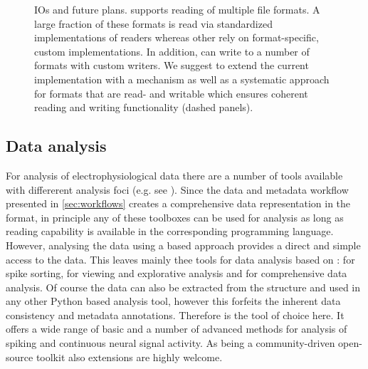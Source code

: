 \begin{figure}
 
 \caption[ IOs and future plans]{ IOs and future plans.  supports reading of multiple file formats. A large fraction of these formats is read via standardized implementations of readers whereas other rely on format-specific, custom implementations. In addition,  can write to a number of formats with custom writers. We suggest to extend the current implementation with a  mechanism as well as a systematic  approach for formats that are read- and writable which ensures coherent reading and writing functionality (dashed panels).}
 \label{fig:disc_neo_plans}
\end{figure}

\subsection{Data analysis}
For analysis of electrophysiological data there are a number of tools available with differerent analysis foci (e.g. see \citet{Unakafova_2019}). Since the data and metadata workflow presented in \cref{sec:workflows} creates a comprehensive data representation in the  format, in principle any of these toolboxes can be used for analysis as long as  reading capability is available in the corresponding programming language. However, analysing the data using a  based approach provides a direct and simple access to the data. This leaves mainly thee tools for data analysis based on :  for spike sorting,  for viewing and explorative analysis and  for comprehensive data analysis. Of course the data can also be extracted from the  structure and used in any other Python based analysis tool, however this forfeits the inherent data consistency and metadata annotations. Therefore  is the tool of choice here. It offers a wide range of basic and a number of advanced methods for analysis of spiking and continuous neural signal activity. As  being a community-driven open-source toolkit also extensions are highly welcome.

